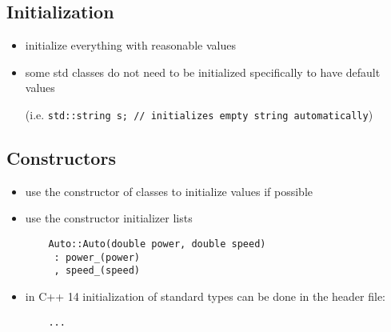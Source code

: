 \subsection{Initialization}

\begin{itemize}
	\item initialize everything with reasonable values
	\item some std classes do not need to be initialized specifically to have default values 
	
	(i.e. \texttt{std::string s; // initializes empty string automatically})
\end{itemize}

\subsection{Constructors}

\begin{itemize}

	\item use the constructor of classes to initialize values if possible
	\item use the constructor initializer lists
	\begin{verbatim}
	Auto::Auto(double power, double speed)
	 : power_(power)
	 , speed_(speed)
	\end{verbatim}
	
	\item in C++ 14 initialization of standard types can be done in the header file:
	\begin{verbatim}
	...
	\end{verbatim}
\end{itemize}